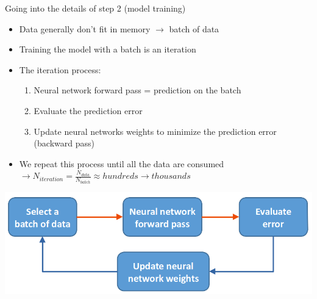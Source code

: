\documentclass[usenames,dvipsnames]{beamer}
\begin{document}
    \begin{frame}{\secname}{\subsecname}
        Going into the details of step 2 (model training)
        \begin{itemize}
            \item Data generally don't fit in memory $\rightarrow$ \alert{batch} of data
            \item Training the model with a batch is an \alert{iteration}
            \item The iteration process:
            \begin{enumerate}
                \item Neural network forward pass = prediction on the batch
                \item Evaluate the prediction error
                \item Update neural networks weights to minimize the prediction error (backward pass)
            \end{enumerate}
            \item We repeat this process until all the data are consumed\\
            $\rightarrow N_{iteration} = \frac{N_{data}}{N_{batch}} \approx hundreds \rightarrow thousands$
        \end{itemize}
        \vspace{-0.7em}
        \begin{center}
            \includegraphics[width=0.7\linewidth]{figures/DL_fundamentals/DL_training_process_iteration.png}
        \end{center}
    \end{frame}
\end{document}
